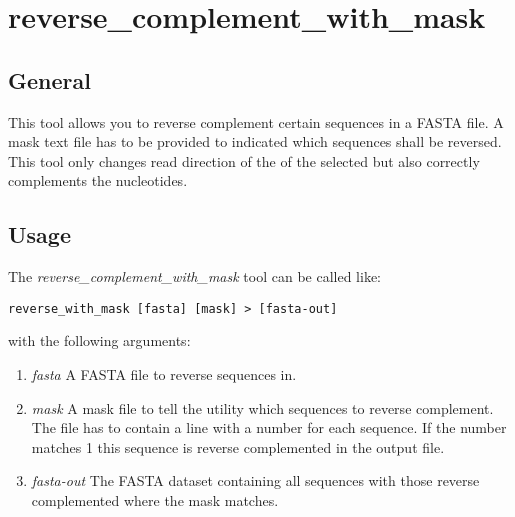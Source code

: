 \section{reverse\_complement\_with\_mask} \label{sec-revcomp}

\subsection{General}

This tool allows you to reverse complement certain sequences in a FASTA file. A
mask text file has to be provided to indicated which sequences shall
be reversed. This tool only changes read direction of the of the
selected but also correctly complements the nucleotides.

\subsection{Usage}

The \emph{reverse\_complement\_with\_mask} tool can be called like:
\begin{lstlisting}
reverse_with_mask [fasta] [mask] > [fasta-out]
\end{lstlisting}
with the following arguments:
\begin{enumerate}
  \item \emph{fasta} A FASTA file to reverse sequences in.
  \item \emph{mask} A mask file to tell the utility which sequences to
    reverse complement. The file has to contain a line with a number for each
    sequence. If the number matches 1 this sequence is reverse complemented
    in the output file.
  \item \emph{fasta-out} The FASTA dataset containing all sequences
    with those reverse complemented where the mask matches.
\end{enumerate}

